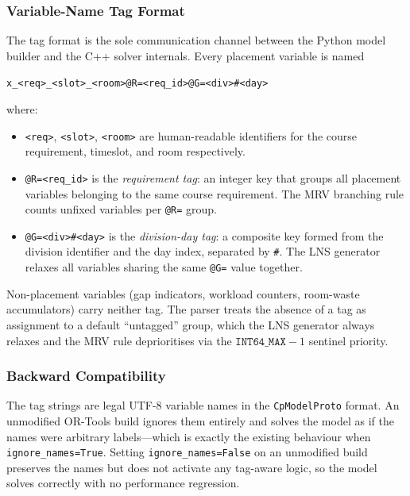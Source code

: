 \documentclass[conference]{IEEEtran}
\begin{document}
\subsubsection{Variable-Name Tag Format}

The tag format is the sole communication channel between the Python model
builder and the C++ solver internals. Every placement variable is named
\begin{center}
  \texttt{x\_<req>\_<slot>\_<room>@R=<req\_id>\allowbreak @G=<div>\#<day>}
\end{center}
where:
\begin{itemize}
  \item \texttt{<req>}, \texttt{<slot>}, \texttt{<room>} are human-readable
        identifiers for the course requirement, timeslot, and room respectively.
  \item \texttt{@R=<req\_id>} is the \emph{requirement tag}: an integer key
        that groups all placement variables belonging to the same course
        requirement. The MRV branching rule counts unfixed variables per
        \texttt{@R=} group.
  \item \texttt{@G=<div>\#<day>} is the \emph{division-day tag}: a composite
        key formed from the division identifier and the day index, separated by
        \texttt{\#}. The LNS generator relaxes all variables sharing the same
        \texttt{@G=} value together.
\end{itemize}

Non-placement variables (gap indicators, workload counters, room-waste
accumulators) carry neither tag. The parser treats the absence of a tag as
assignment to a default ``untagged'' group, which the LNS generator always
relaxes and the MRV rule deprioritises via the $\mathtt{INT64\_MAX}{-}1$
sentinel priority.

\subsubsection{Backward Compatibility}

The tag strings are legal UTF-8 variable names in the \texttt{CpModelProto}
format. An unmodified OR-Tools build ignores them entirely and solves the
model as if the names were arbitrary labels---which is exactly the existing
behaviour when \texttt{ignore\_names=True}. Setting \texttt{ignore\_names=False}
on an unmodified build preserves the names but does not activate any tag-aware
logic, so the model solves correctly with no performance regression.
\end{document}
